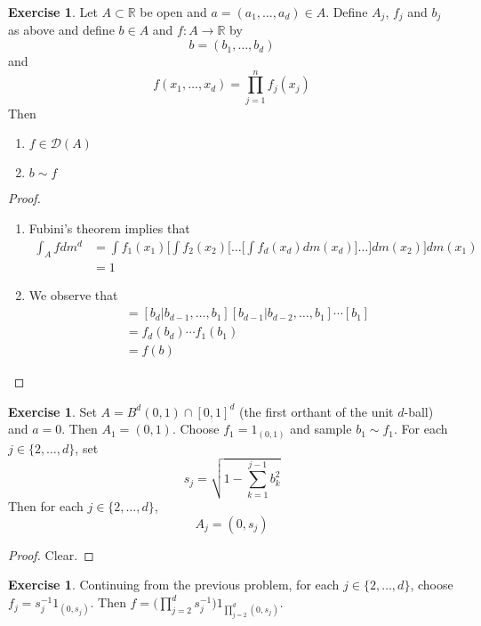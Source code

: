 \documentclass[12pt]{amsart}
\theoremstyle{definition}
\newtheorem{ex}[definition]{Exercise}
\newcommand{\R}{\mathbb{R}}
\newcommand{\MD}{\mathcal{D}}
\begin{document}
	\begin{ex}
	Let $A \subset \R$ be open and $a = (a_1, \dots, a_d) \in A$. Define $A_j$, $f_j$ and $b_j$ as above and define $b \in A$ and $f: A \rightarrow \R$ by $$b = (b_1, \dots, b_d)$$ and  $$f(x_1, \dots, x_d) = \prod_{j=1}^nf_j(x_j)$$ 
	Then 
	\begin{enumerate}
	\item $f \in \MD(A)$ 
	\item $b \sim f$
	\end{enumerate}
	\end{ex}
	
	\begin{proof}
	\begin{enumerate}
	\item Fubini's theorem implies that 
	\begin{align*}
	\int_A f dm^d
	&= \int f_1(x_1) \bigg[ \int f_2(x_2) \bigg[ \dots \bigg[ \int f_d(x_d) dm(x_d) \bigg] \dots \bigg] dm(x_2) \bigg] dm(x_1) \\
	&= 1
	\end{align*} 
	\item We observe that 
	\begin{align*}
	[b] 
	&= [b_d| b_{d-1}, \ldots, b_1][b_{d-1}| b_{d-2}, \ldots, b_1] \cdots [b_1] \\
	&= f_d(b_d) \cdots f_1(b_1) \\
	&= f(b)
	\end{align*}
	
	\end{enumerate}
	\end{proof}
	
	\begin{ex}
	Set $A = B^d(0, 1) \cap [0,1]^d$ (the first orthant of the unit $d$-ball) and $a = 0$. Then $A_1 = (0,1)$. Choose $f_1 = 1_{(0,1)}$ and sample $b_1 \sim f_1$. For each $j \in \{2, \ldots, d\}$, set $$s_j = \sqrt{1 - \sum_{k=1}^{j-1} b^2_k}$$ 
	Then for each $j \in \{2, \ldots, d\}$, $$A_j = ( 0, s_j)$$ 
	\end{ex}
	
	\begin{proof}
	Clear.
	\end{proof}
	
	\begin{ex}
	Continuing from the previous problem, for each $j \in \{2, \ldots, d\}$, choose $f_j = s_j^{-1}1_{(0, s_j )}$. Then $f	 = \bigg( \prod_{j=2}^ds^{-1}_j \bigg) 1_{\prod_{j=2}^d (0, s_j)}$. 
	\end{ex}
	
\end{document}
